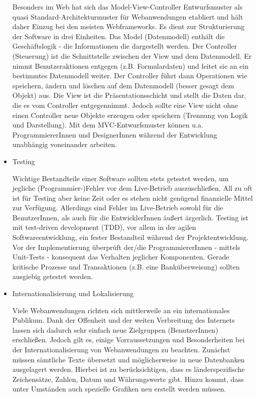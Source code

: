 \documentclass[
11pt, %
a4paper, %
BCOR25mm, %
DIV14, %
footsepline = false, %
headsepline, %
twoside, %
openright,
abstracton, %
listof=totocnumbered, %
bibliography=totocnumbered %
]{scrreprt}
\begin{document}
\begin{itemize}
Besonders im Web hat sich das Model-View-Controller Entwurfsmuster als quasi
Standard-Architekturmuster für Webanwendungen etabliert und hält daher Einzug
bei den meisten Webframeworks. Es dient zur Strukturierung der Software in drei
Einheiten. Das Model (Datenmodell) enthält die Geschäftslogik - die
Informationen die dargestellt werden. Der Controller (Steuerung) ist die
Schnittstelle zwischen der View und dem Datenmodell. Er nimmt Benutzeraktionen
entgegen (z.B. Formulardaten) und leitet sie an ein bestimmtes Datenmodell
weiter. Der Controller führt dann Operationen wie speichern, ändern und löschen
auf dem Datenmodell (besser gesagt dem Objekt) aus. Die View ist die
Präsentationsschicht und stellt die Daten dar, die es vom Controller
entgegennimmt. Jedoch sollte eine View nicht ohne einen Controller neue Objekte
erzeugen oder speichern (Trennung von Logik und Darstellung). Mit dem
MVC-Entwurfsmuster können u.a. ProgrammiererInnen und DesignerInnen während der
Entwicklung unabhängig voneinander arbeiten.

  \item Testing

Wichtige Bestandteile einer Software sollten stets getestet werden, um jegliche
(Programmier-)Fehler vor dem Live-Betrieb auszuschließen. All zu oft ist für
Testing aber keine Zeit oder es stehen nicht genügend finanzielle Mittel zur
Verfügung. Allerdings sind Fehler im Live-Betrieb sowohl für die BenutzerInnen,
als auch für die EntwicklerInnen äußert ärgerlich. Testing ist mit test-driven
development (TDD), vor allem in der agilen Softwareentwicklung, ein fester
Bestandteil während der Projektentwicklung. Vor der Implementierung überprüft
der/die ProgrammiererInnen - mittels Unit-Tests - konsequent das Verhalten
jeglicher Komponenten. Gerade kritische Prozesse und Transaktionen (z.B. eine
Banküberweisung) sollten ausgiebig getestet werden.

  \item Internationalisierung und Lokalisierung

Viele Webanwendungen richten sich mittlerweile an ein internationales Publikum.
Dank der Offenheit und der weiten Verbreitung des Internets lassen sich dadurch
sehr einfach neue Zielgruppen (BenutzerInnen) erschließen. Jedoch gilt es,
einige Vorraussetzungen und Besonderheiten bei der Internationalisierung von
Webanwendungen zu beachten. Zunächst müssen sämtliche Texte übersetzt und
möglicherweise in neue Datenbanken ausgelagert werden. Hierbei ist zu
berücksichtigen, dass es länderspezifische Zeichensätze, Zahlen, Datum und
Währungswerte gibt. Hinzu kommt, dass unter Umständen auch spezielle Grafiken
neu erstellt werden müssen.


\end{itemize}
\end{document}
